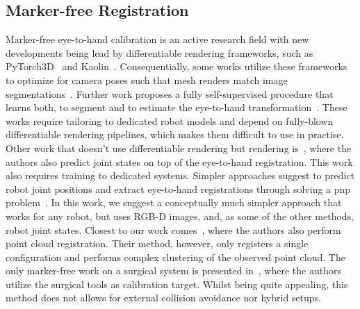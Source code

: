\subsection{Marker-free Registration}
Marker-free eye-to-hand calibration is an active research field with new developments being lead by differentiable rendering frameworks, such as PyTorch3D~\cite{ravi2020pytorch3d} and Kaolin~\cite{KaolinLibrary}. Consequentially, some works utilize these frameworks to optimize for camera poses such that mesh renders match image segmentations~\cite{chen2023easyhec}. Further work proposes a fully self-supervised procedure that learns both, to segment and to estimate the eye-to-hand transformation~\cite{lu2023markerless}. These works require tailoring to dedicated robot models and depend on fully-blown differentiable rendering pipelines, which makes them difficult to use in practise. Other work that doesn't use differentiable rendering but rendering is~\cite{labbe2021single}, where the authors also predict joint states on top of the eye-to-hand registration. This work also requires training to dedicated systems. Simpler approaches suggest to predict robot joint positions and extract eye-to-hand registrations through solving a \acrshort{pnp} problem~\cite{lee2020camera}. In this work, we suggest a conceptually much simpler approach that works for any robot, but uses RGB-D images, and, as some of the other methods, robot joint states. Closest to our work comes~\cite{point_cloud_based_robot_cell_calib}, where the authors also perform point cloud registration. Their method, however, only registers a single configuration and performs complex clustering of the observed point cloud. The only marker-free work on a surgical system is presented in~\cite{hand_eye_calibration_robotic_assisted}, where the authors utilize the surgical tools as calibration target. Whilst being quite appealing, this method does not allows for external collision avoidance nor hybrid setups.



